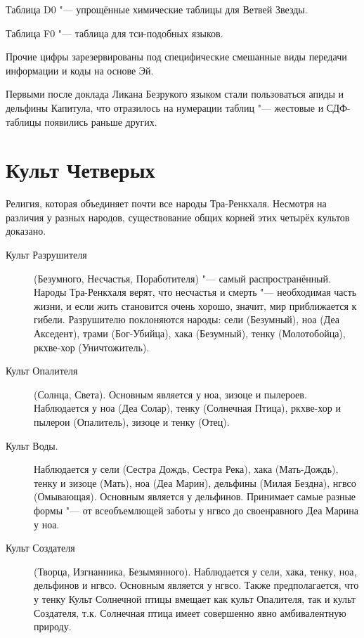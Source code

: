 \documentclass[a4paper,10pt,fleqn]{book}
\begin{document}
Таблица D0 "--- упрощённые химические таблицы для Ветвей Звезды.

Таблица F0 "--- таблица для тси-подобных языков.

Прочие цифры зарезервированы под специфические смешанные виды передачи информации и коды на основе Эй.

Первыми после доклада Ликана Безрукого языком стали пользоваться апиды и дельфины Капитула, что отразилось на нумерации таблиц "--- жестовые и СДФ-таблицы появились раньше других.

\section{Культ Четверых}

Религия, которая объединяет почти все народы Тра-Ренкхаля.
Несмотря на различия у разных народов, существование общих корней этих четырёх культов доказано.

\begin{description}
\item[Культ Разрушителя] (Безумного, Несчастья, Поработителя) "--- самый распространённый.
Народы Тра-Ренкхаля верят, что несчастья и смерть "--- необходимая часть жизни, и если жить становится очень хорошо, значит, мир приближается к гибели.
Разрушителю поклоняются народы: сели (Безумный), ноа (Деа Акседент), трами (Бог-Убийца), хака (Безумный), тенку (Молотобойца), ркхве-хор (Уничтожитель).

\item[Культ Опалителя] (Солнца, Света).
Основным является у ноа, зизоце и пылероев.
Наблюдается у ноа (Деа Солар), тенку (Солнечная Птица), ркхве-хор и пылерои (Опалитель), зизоце и тенку (Отец).

\item[Культ Воды.] Наблюдается у сели (Сестра Дождь, Сестра Река), хака (Мать-Дождь), тенку и зизоце (Мать), ноа (Деа Марин), дельфины (Милая Бездна), нгвсо (Омывающая).
Основным является у дельфинов. Принимает самые разные формы "--- от всеобъемлющей заботы у нгвсо до своенравного Деа Марина у ноа.

\item[Культ Создателя] (Творца, Изгнанника, Безымянного).
Наблюдается у сели, хака, тенку, ноа, дельфинов и нгвсо.
Основным является у нгвсо.
Также предполагается, что у тенку Культ Солнечной птицы вмещает как культ Опалителя, так и культ Создателя, т.к. Солнечная птица имеет совершенно явно амбивалентную природу.
\end{description}
\end{document}
